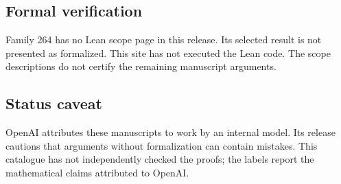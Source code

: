 \documentclass[11pt]{article}
\begin{document}
\subsection{Formal verification}
Family 264 has no Lean scope page in this release. Its selected result is not presented as formalized. This site has not executed the Lean code. The scope descriptions do not certify the remaining manuscript arguments.

\subsection{Status caveat}
OpenAI attributes these manuscripts to work by an internal model. Its release cautions that arguments without formalization can contain mistakes. This catalogue has not independently checked the proofs; the labels report the mathematical claims attributed to OpenAI.
\end{document}
